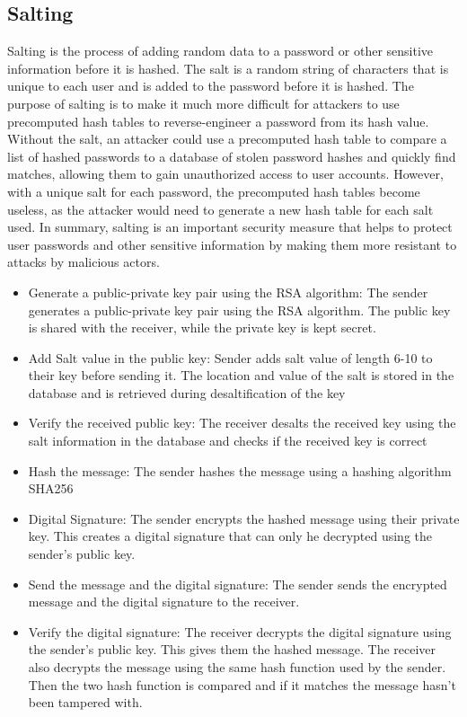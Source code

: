\subsection*{Salting}
Salting is the process of adding random data to a password or other sensitive information before it is hashed.
The salt is a random string of characters that is unique to each user and is added to the password before it is hashed.
The purpose of salting is to make it much more difficult for attackers to use precomputed hash tables to reverse-engineer
a password from its hash value. Without the salt, an attacker could use a precomputed hash table to compare a list of hashed
passwords to a database of stolen password hashes and quickly find matches, allowing them to gain unauthorized access to user accounts.
However, with a unique salt for each password, the precomputed hash tables become useless, as the attacker would need to generate a new hash table for each salt used.
In summary, salting is an important security measure that helps to protect user passwords and other sensitive information by making
them more resistant to attacks by malicious actors.\\
\begin{itemize}
	\item Generate a public-private key pair using the RSA algorithm: The sender generates a public-private key pair using the RSA algorithm.
	      The public key is shared with the receiver, while the private key is kept secret.
	\item Add Salt value in the public key: Sender adds salt value of length 6-10 to their key before sending it.
	      The location and value of the salt is stored in the database and is retrieved during desaltification of the key
	\item Verify the received public key: The receiver desalts the received key using the salt information in the database and
	      checks if the received key is correct
	\item Hash the message: The sender hashes the message using a hashing algorithm SHA256
	\item Digital Signature: The sender encrypts the hashed message using their private key.
	      This creates a digital signature that can only he decrypted using the sender's public key.
	\item Send the message and the digital signature: The sender sends the encrypted message and the digital signature to the receiver.
	\item Verify the digital signature: The receiver decrypts the digital signature using the sender's public key.
	      This gives them the hashed message. The receiver also decrypts the message using the same hash function used by the sender.
	      Then the two hash function is compared and if it matches the message hasn't been tampered with.
\end{itemize}

